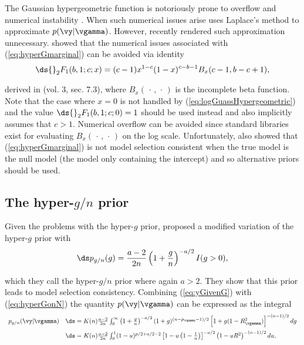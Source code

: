 The Gaussian hypergeometric function is notoriously prone 
to overflow and numerical instability \citep{Pearson2017}. When such numerical issues arise 
\cite{Liang2008} uses Laplace's method to approximate $p(\vy|\vgamma)$. 
However, recently \cite{Nadarajah2015}
rendered such approximation unnecessary.
\cite{Nadarajah2015} showed that the numerical issues associated with (\ref{eq:hyperGmarginal}) can be avoided 
via identity 
\begin{equation}\label{eq:logGuassHypergeometric}
\ds {}_2F_1(b,1;c;x) = (c-1) x^{1-c} (1-x)^{c-b-1} B_x (c-1, b-c+1),
\end{equation}

\noindent derived in \cite{PrudnikovEtal1986} (vol. 3, sec. 7.3), where 
$B_x(\,\cdot\,,\,\cdot\,)$
is the incomplete beta function. Note that the case where $x=0$ is not handled by 
(\ref{eq:logGuassHypergeometric}) and the value $\ds {}_2F_1(b,1;c;0) = 1$ should be used instead
and also implicitly assumes that $c>1$. Numerical overflow can be avoided
since standard libraries exist for evaluating $B_x(\,\cdot\,,\,\cdot\,)$
on the log scale.
Unfortunately, \cite{Liang2008} also showed that
(\ref{eq:hyperGmarginal}) is not model selection consistent when the
true model is the null model (the model only containing the intercept) and so alternative priors should be used.




\subsection{The hyper-$g/n$ prior}

Given the problems with the hyper-$g$ prior, \cite{Liang2008} 
proposed a modified variation of the hyper-$g$ prior with
\begin{equation}\label{eq:hyperGonN}
\ds p_{g/n}(g) = \frac{a - 2}{2n}\left( 1 + \frac{g}{n} \right)^{-a/2}I(g>0),
\end{equation}

\noindent which they call the hyper-$g/n$ prior where again $a>2$.
They show that this prior leads to model selection consistency.
Combining (\ref{eq:yGivenG}) with (\ref{eq:hyperGonN}) the quantity $p(\vy|\vgamma)$ 
can be expressed as the integral
\begin{equation}\label{eq:hyperGonNmarginalIntegral}
\begin{array}{rl}
p_{g/n}(\vy|\vgamma) 
& \ds 
= K(n) \frac{a - 2}{2n}  \int_0^\infty 
\left( 1 + \frac{g}{n} \right)^{-a/2}
(1 + g)^{(n-p_\vgamma-1)/2} \left[ 1 + g (1 - R_\vgamma^2) \right]^{-(n-1)/2}  dg
\\ [2ex]
& \ds = K(n) \frac{a - 2}{2n}  \int_0^1 
(1 - u)^{p/2 + a/2 - 2  } \left[ 1 - u \left(1  -  \tfrac{1}{n} \right) \right]^{-a/2} \left(  1 - u R^2\right)^{-(n-1)/2} du,
\end{array} 
\end{equation}

